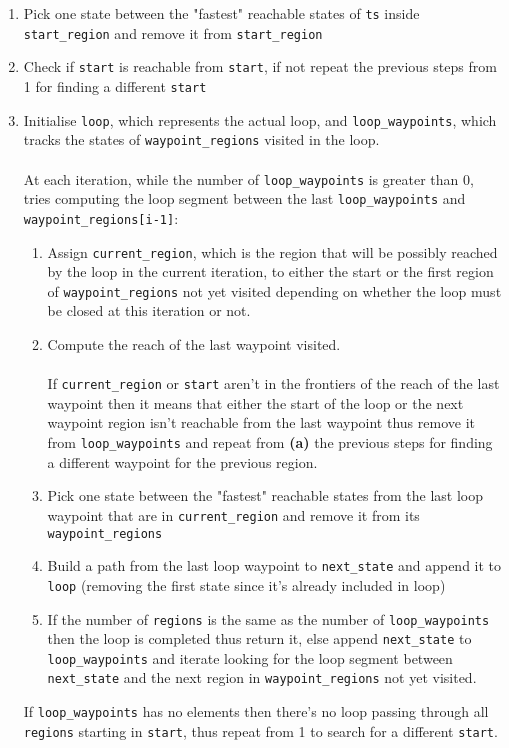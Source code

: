 \documentclass[11pt]{article}
\newcommand{\minline}[1]{{\footnotesize \texttt{#1}}}
\begin{document}
\begin{enumerate}
	\item Pick one state between the "fastest" reachable states of \minline{ts}
	      inside \minline{start_region} and remove it from
	      \minline{start_region}
	\item Check if \minline{start} is reachable from \minline{start}, if not
	      repeat the previous steps from 1 for finding a different
	      \minline{start}
	\item Initialise \minline{loop}, which represents the actual loop, and
	      \minline{loop_waypoints}, which tracks the states of
	      \minline{waypoint_regions} visited in the loop.
	      \\ \\
	      At each iteration, while the number of \minline{loop_waypoints} is
	      greater than 0, tries computing the loop segment between the last
	      \minline{loop_waypoints} and \minline{waypoint_regions[i-1]}:
	      \begin{enumerate}
		      \item Assign \minline{current_region}, which is the region that will
		            be possibly reached by the loop in the current iteration, to
		            either the start or the first region of
		            \minline{waypoint_regions} not yet visited depending on
		            whether the loop must be closed at this iteration or not.
		      \item Compute the reach of the last waypoint visited.\\ \\
		            If \minline{current_region} or \minline{start} aren't in the
		            frontiers of the reach of the last waypoint then it means that
		            either the start of the loop or the next waypoint region
		            isn't reachable from the last waypoint thus remove it from
		            \minline{loop_waypoints} and repeat from \textbf{(a)} the
		            previous steps for finding a different waypoint for the
		            previous region.
		      \item Pick one state between the "fastest" reachable states from the
		            last loop waypoint that are in \minline{current_region} and
		            remove it from its \minline{waypoint_regions}
		      \item Build a path from the last loop waypoint to
		            \minline{next_state} and append it to \minline{loop} (removing
		            the first state since it's already included in loop)
		      \item If the number of \minline{regions} is the same as the number
		            of \minline{loop_waypoints} then the loop is completed thus
		            return it, else append \minline{next_state} to
		            \minline{loop_waypoints} and iterate looking for the loop
		            segment between \minline{next_state} and the next region in
		            \minline{waypoint_regions} not yet visited.
	      \end{enumerate}
	      If \minline{loop_waypoints} has no elements then there's no loop
	      passing through all \minline{regions} starting in \minline{start},
	      thus repeat from 1 to search for a different \minline{start}.
\end{enumerate}
\end{document}
